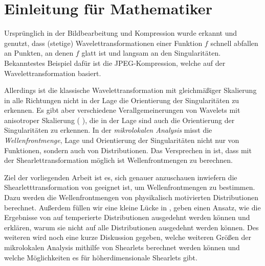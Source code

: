 \section{Einleitung für Mathematiker} %
\label{sec:einleitung_mathematik}

Ursprünglich in der Bildbearbeitung und Kompression wurde erkannt und genutzt, dass (stetige) Wavelettransformationen einer Funktion $f$ schnell abfallen an Punkten, an denen $f$ glatt ist und langsam an den Singularitäten. Bekanntestes Beispiel dafür ist die JPEG-Kompression, welche auf der Wavelettransformation basiert.

Allerdings ist die klassische Wavelettransformation mit gleichmäßiger Skalierung in alle Richtungen nicht in der Lage die Orientierung der Singularitäten zu erkennen. Es gibt aber verschiedene Verallgemeinerungen von Wavelets mit anisotroper Skalierung (\cite{Guo2006} \cite{Kutyniok2008} \cite{Candes2005}), die in der Lage sind auch die Orientierung der Singularitäten zu erkennen.
In der \emph{mikrolokalen Analysis} misst die \emph{Wellenfrontmenge}, Lage und Orientierung der Singularitäten nicht nur von Funktionen, sondern auch von Distributionen. Das Versprechen in \cite{Kutyniok2008} ist, dass mit der Shearlettransformation möglich ist Wellenfrontmengen zu berechnen.

Ziel der vorliegenden Arbeit ist es, sich genauer anzuschauen inwiefern die Shearletttransformation von \textcite{Kutyniok2008} geeignet ist, um Wellenfrontmengen zu bestimmen. Dazu werden die Wellenfrontmengen von physikalisch motivierten Distributionen berechnet. Außerdem füllen wir eine kleine Lücke in \cite{Kutyniok2008}, geben einen Ansatz, wie die Ergebnisse von \textcite{Kutyniok2008} auf temperierte Distributionen ausgedehnt werden können und erklären, warum sie nicht auf alle Distributionen ausgedehnt werden können.
Des weiteren wird noch eine kurze Diskussion gegeben, welche weiteren Größen der mikrolokalen Analysis mithilfe von Shearlets berechnet werden können und welche Möglichkeiten es für höherdimensionale Shearlets gibt.


